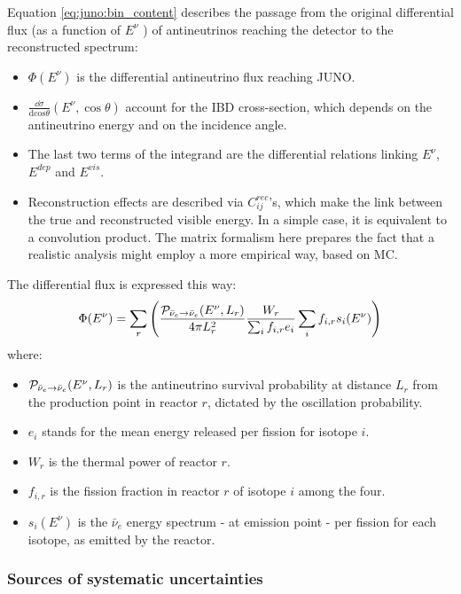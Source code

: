 \documentclass[../main.tex]{subfiles}
\begin{document}
Equation \ref{eq:juno:bin_content} describes the passage from the original differential flux (as a function of $E^{\nu}$ ) of antineutrinos reaching the detector to the reconstructed spectrum:
\begin{itemize}
  \item $\Phi(E^{\nu})$ is the differential antineutrino flux reaching JUNO.
  \item $\frac{\dd\sigma}{\mathrm{dcos}\theta}(E^{\nu}, \cos\theta)$ account for the IBD cross-section, which depends on the antineutrino energy and on the incidence angle.
  \item The last two terms of the integrand are the differential relations linking $E^{\nu}$, $E^{dep}$ and $E^{vis}$.
  \item Reconstruction effects are described via $C^{rec}_{ij}$'s, which make the link between the true and reconstructed visible energy. In a simple case, it is equivalent to a convolution product. The matrix formalism here prepares the fact that a realistic analysis might employ a more empirical way, based on MC.
\end{itemize}
\hfill

The differential flux is expressed this way:
\begin{equation}
\Phi(E^{\nu}) = \sum_{r} \left( \frac{{\cal P}_{\bar{\nu}_e\rightarrow \bar{\nu}_e}(E^{\nu},L_r)}{4\pi L^2_r} \frac{W_r}{\sum_{i} f_{i,r} e_i} \sum_{i} f_{i,r} s_i(E^{\nu}) \right)
\end{equation}
where:
\begin{itemize}
  \item ${\cal P}_{\bar{\nu}_e\rightarrow \bar{\nu}_e}(E^{\nu},L_r)$ is the antineutrino survival probability at distance $L_r$ from the production point in reactor $r$, dictated by the oscillation probability.
  \item $e_i$ stands for the mean energy released per fission for isotope $i$.
  \item $W_r$ is the thermal power of reactor $r$.
  \item $f_{i,r}$ is the fission fraction in reactor $r$ of isotope $i$ among the four.
  \item $s_i(E^{\nu})$ is the $\bar{\nu}_e$ energy spectrum - at emission point -  per fission for each isotope, as emitted by the reactor.
\end{itemize}
\hfill

\subsubsection{Sources of systematic uncertainties}
\end{document}
